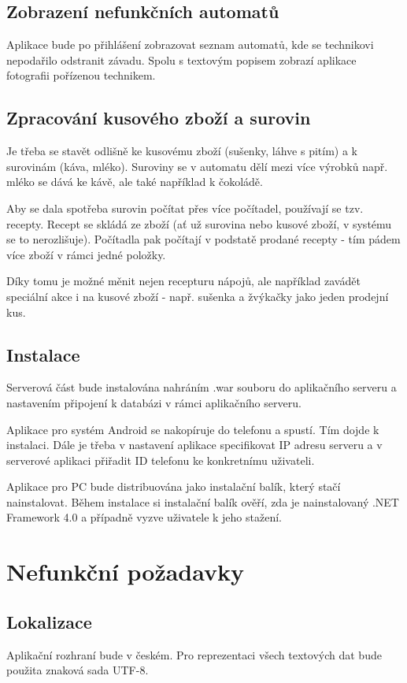 \documentclass[a4paper,10pt]{article}
\begin{document}
\subsection{Zobrazení nefunkčních automatů}
Aplikace bude po přihlášení zobrazovat seznam automatů, kde se technikovi nepodařilo odstranit závadu. Spolu s textovým popisem zobrazí aplikace fotografii pořízenou technikem.
\subsection{Zpracování kusového zboží a surovin}
Je třeba se stavět odlišně ke kusovému zboží (sušenky, láhve s pitím) a k surovinám (káva, mléko). Suroviny se v automatu dělí mezi více výrobků např. mléko se dává ke kávě, ale také například k čokoládě.

Aby se dala spotřeba surovin počítat přes více počítadel, používají se tzv. recepty. Recept se skládá ze zboží (ať už surovina nebo kusové zboží, v systému se to nerozlišuje). Počítadla pak počítají v podstatě prodané recepty - tím pádem více zboží v rámci jedné položky.

Díky tomu je možné měnit nejen recepturu nápojů, ale například zavádět speciální akce i na kusové zboží - např. sušenka a žvýkačky jako jeden prodejní kus.

\subsection{Instalace}
Serverová část bude instalována nahráním .war souboru do aplikačního serveru a nastavením připojení k databázi v rámci aplikačního serveru.

Aplikace pro systém Android se nakopíruje do telefonu a spustí. Tím dojde k instalaci. Dále je třeba v nastavení aplikace specifikovat IP adresu serveru a v serverové aplikaci přiřadit ID telefonu ke konkretnímu uživateli.

Aplikace pro PC bude distribuována jako instalační balík, který stačí nainstalovat. Během instalace si instalační balík ověří, zda je nainstalovaný .NET Framework 4.0 a případně vyzve uživatele k jeho stažení.
\section{Nefunkční požadavky}
\subsection{Lokalizace}
Aplikační rozhraní bude v českém. Pro reprezentaci všech textových dat bude použita znaková sada UTF-8.
\end{document}
